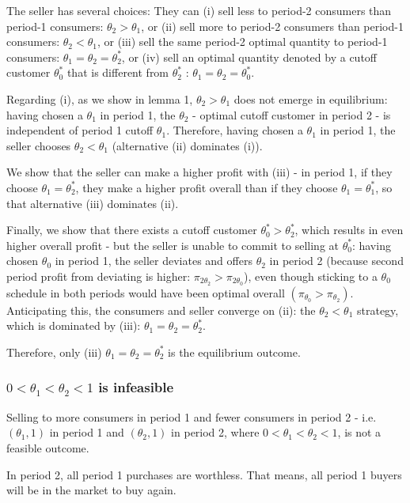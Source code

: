 \documentclass[isre,blindrev]{informs3} %
\begin{document}
The seller has several choices: They can (i) sell less to period-2 consumers than period-1 consumers: \(\theta _2>\theta _1\), or (ii) sell more
to period-2 consumers than period-1 consumers: \(\theta _2<\theta _1\), or (iii) sell the same period-2 optimal quantity to period-1 consumers: \(\theta
_1=\theta _2=\theta _2^*\), or (iv) sell an optimal quantity denoted by a cutoff customer \(\theta _0^*\) that is different from \(\theta _2^*\) : \(\theta _1=\theta _2=\theta _0^*\).

Regarding (i), as we show in lemma 1, \(\theta _2>\theta _1\) does not emerge in equilibrium: having chosen a \(\theta _1\) in period 1, the \(\theta
_2\) - optimal cutoff customer in period 2 - is independent of period 1 { }cutoff \(\theta _1\). Therefore, having chosen a \(\theta _1\) in period
1, the seller chooses \(\theta _2<\theta _1\) (alternative (ii) dominates (i)). 

We show that the seller can make a higher profit with (iii) - in period 1, if they choose \(\theta _1=\theta _2^*\), they make a higher profit overall
than if they choose \(\theta _1=\theta _1^*\), so that alternative (iii) dominates (ii). 

Finally, we show that there exists a cutoff customer \(\theta _0^*>\theta _2^*\), which results in even higher overall profit - but the seller is
unable to commit to selling at \(\theta _0^*\): having chosen \(\theta _0\) in period 1, the seller deviates and offers \(\theta _2\) in period 2
(because second period profit from deviating is higher: \(\pi _{2\theta _2}>\pi _{2\theta _0}\)), even though sticking to a \(\theta _0\) schedule
in both periods would have been optimal overall \(\left(\pi _{\theta _0}>\pi _{\theta _2}\right)\). Anticipating this, the consumers and seller converge
on (ii): the \(\theta _2<\theta _1\) strategy, which is dominated by (iii): \(\theta _1=\theta _2=\theta _2^*\).

Therefore, only (iii) \(\theta _1=\theta _2=\theta _2^*\) is the equilibrium outcome.

\subsubsection{\(0<\theta _1<\theta _2<1\) is infeasible }

\begin{lemma}
Selling to more consumers in period 1 and fewer consumers in period 2 - i.e. \(\left(\theta _1,1\right)\) { }in period 1 and { }\(\left(\theta
_2,1\right)\) in period 2, where \(0<\theta _1<\theta _2<1\), is not a feasible outcome. { } 
\end{lemma}
In period 2, all period 1 purchases are worthless. That means, all period 1 buyers will be in the market to buy again.
\end{document}
